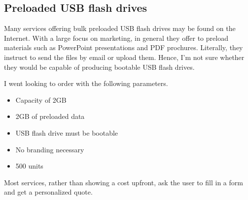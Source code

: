         \subsection{Preloaded USB flash drives}
            Many services offering bulk preloaded USB flash drives may be found on the Internet.  With a large focus on marketing, in general they offer to preload materials such as PowerPoint presentations and PDF prochures\cite{flashbay-data-preloading}.  Literally, they instruct to send the files by email or upload them.  Hence, I'm not sure whether they would be capable of producing bootable USB flash drives.
            
            I went looking to order with the following parameters.
            \begin{itemize}
                \item Capacity of 2GB
                \item 2GB of preloaded data
                \item USB flash drive must be bootable
                \item No branding necessary
                \item 500 units
            \end{itemize}
            
            Most services, rather than showing a cost upfront, ask the user to fill in a form and get a personalized quote.
            
            
        \blind[3]
